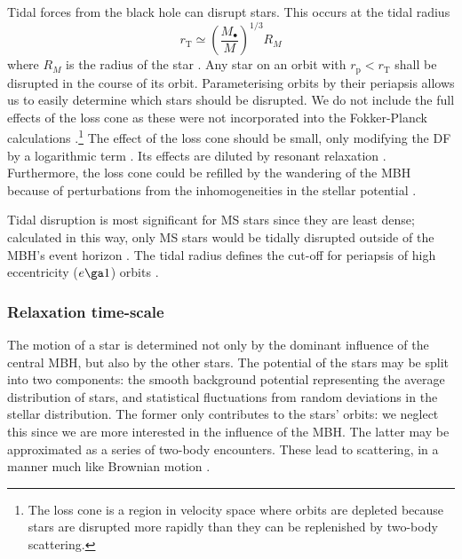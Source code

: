 \documentclass[useAMS,usedcolumn,usegraphicx,usenatbib]{mn2e}
\newcommand{\sub}[1]{\ensuremath{_\mathrm{#1}}}
\begin{document}
Tidal forces from the black hole can disrupt stars. This occurs at the tidal radius
\begin{equation}
r\sub{T} \simeq \left(\frac{M_\bullet}{M}\right)^{1/3}R_M
\label{eq:Tidal}
\end{equation}
where $R_M$ is the radius of the star \citep{Hills1975, Rees1988, Kobayashi2004}. Any star on an orbit with $r\sub{p} < r\sub{T}$ shall be disrupted in the course of its orbit. Parameterising orbits by their periapsis allows us to easily determine which stars should be disrupted. We do not include the full effects of the loss cone \citep{Frank1976, Lightman1977, Cohn1978} as these were not incorporated into the Fokker-Planck calculations \citep{Hopman2009}.\footnote{The loss cone is a region in velocity space where orbits are depleted because stars are disrupted more rapidly than they can be replenished by two-body scattering.} The effect of the loss cone should be small, only modifying the DF by a logarithmic term \citep{Lightman1977, Bahcall1977, Cohn1978}. Its effects are diluted by resonant relaxation \citep{Hopman2007,Toonen2009,Merritt2011}. Furthermore, the loss cone could be refilled by the wandering of the MBH because of perturbations from the inhomogeneities in the stellar potential \citep{Sigurdsson1997,Chatterjee2002,Merritt2007}.

Tidal disruption is most significant for MS stars since they are least dense; calculated in this way, only MS stars would be tidally disrupted outside of the MBH's event horizon \citep{Sigurdsson1997}. The tidal radius defines the cut-off for periapsis of high eccentricity ($e \ga 1$) orbits \citep{Lightman1977}.

\subsubsection{Relaxation time-scale}\label{sec:Relax}

The motion of a star is determined not only by the dominant influence of the central MBH, but also by the other stars. The potential of the stars may be split into two components: the smooth background potential representing the average distribution of stars, and statistical fluctuations from random deviations in the stellar distribution. The former only contributes to the stars' orbits: we neglect this since we are more interested in the influence of the MBH. The latter may be approximated as a series of two-body encounters. These lead to scattering, in a manner much like Brownian motion \citep{Bekenstein1992,Maoz1993,Nelson1999}.
\end{document}
